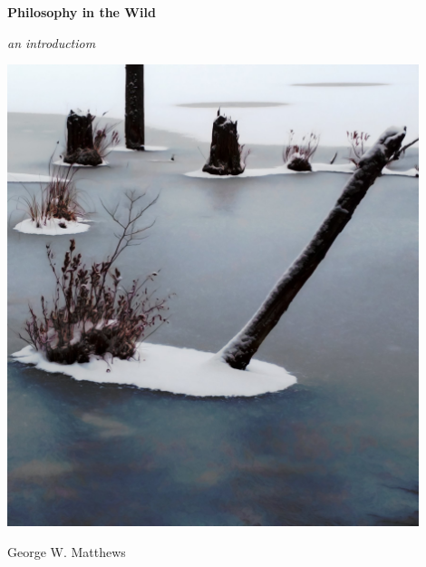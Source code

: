 \thispagestyle{empty}
\begin{center}

{\Huge\textbf{Philosophy in the Wild}}



{\Large\textit{an introductiom}}

\vspace*{2em}

\includegraphics[width=12cm]{img/cover.jpg}

\vspace*{2em}

{\large George W. Matthews}

{\normalsize {}}

\end{center}

